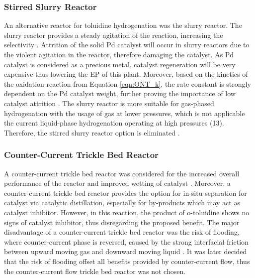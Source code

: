 \subsubsection{Stirred Slurry Reactor}
An alternative reactor for toluidine hydrogenation was the slurry reactor. The slurry reactor provides a steady agitation of the reaction, increasing the selectivity \cite{p_a_ramachandran_recent_1987}. Attrition of the solid Pd catalyst will occur in slurry reactors due to the violent agitation in the reactor, therefore damaging the catalyst. As Pd catalyst is considered as a precious metal, catalyst regeneration will be very expensive thus lowering the EP of this plant. Moreover, based on the kinetics of the oxidation reaction from Equation \ref{eqn:ONT_k}, the rate constant is strongly dependent on the Pd catalyst weight, further proving the importance of low catalyst attrition \cite{rajadhyaksha_solvent_1986}.
The slurry reactor is more suitable for gas-phased hydrogenation with the usage of  gas at lower pressures, which is not applicable the current liquid-phase hydrogenation operating at high pressures (\SI{13}{\atm}). Therefore, the stirred slurry reactor option is eliminated \cite{ranade_chapter_2011}.

\subsubsection{Counter-Current Trickle Bed Reactor}
A counter-current trickle bed reactor was considered for the increased overall performance of the reactor and improved wetting of catalyst \cite{kundu_novel_2003}. Moreover, a counter-current trickle bed reactor provides the option for in-situ separation for catalyst via catalytic distillation, especially for by-products which may act as catalyst inhibitor. However, in this reaction, the product of o-toluidine shows no signs of catalyst inhibitor, thus disregarding the proposed benefit. The major disadvantage of a counter-current trickle bed reactor was the risk of flooding, where counter-current phase is reversed, caused by the strong interfacial friction between upward moving gas and downward moving liquid \cite{breijer_prevention_2008}. It was later decided that the risk of flooding offset all benefits provided by counter-current flow, thus the counter-current flow trickle bed reactor was not chosen. 

